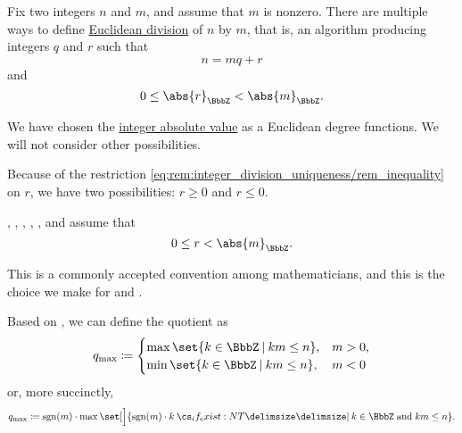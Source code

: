 \begin{remark}\label{rem:integer_division_uniqueness}
  Fix two integers \( n \) and \( m \), and assume that \( m \) is nonzero. There are multiple ways to define \hyperref[def:euclidean_domain]{Euclidean division} of \( n \) by \( m \), that is, an algorithm producing integers \( q \) and \( r \) such that
  \begin{equation*}
    n = mq + r
  \end{equation*}
  and
  \begin{equation}\label{eq:rem:integer_division_uniqueness/rem_inequality}
    0 \leq \abs{r}_\BbbZ < \abs{m}_\BbbZ.
  \end{equation}

  We have chosen the \hyperref[def:integer_absolute_value]{integer absolute value} as a Euclidean degree functions. We will not consider other possibilities.

  Because of the restriction \eqref{eq:rem:integer_division_uniqueness/rem_inequality} on \( r \), we have two possibilities: \( r \geq 0 \) and \( r \leq 0 \).

  \begin{thmenum}
     , , , , ,  and  assume that
    \begin{equation*}
      0 \leq r < \abs{m}_\BbbZ.
    \end{equation*}

    This is a commonly accepted convention among mathematicians, and this is the choice we make for  and \cite{code}.

    Based on \cite[prop. 1.1]{Knapp2016BasicAlgebra}, we can define the quotient as
    \begin{equation}\label{eq:rem:integer_division_uniqueness/max/q_cases}
      q_{\max} \coloneqq \begin{cases}
        \max\set{ k \in \BbbZ \given km \leq n }, &m > 0, \\
        \min\set{ k \in \BbbZ \given km \leq n }, &m < 0
      \end{cases}
    \end{equation}
    or, more succinctly,
    \begin{equation}\label{eq:rem:integer_division_uniqueness/max/q}
      q_{\max} \coloneqq \sgn(m) \cdot \max\set[\Big]{ \sgn(m) \cdot k \given* k \in \BbbZ \T{and} km \leq n }.
    \end{equation}


\end{thmenum}
\end{remark}
